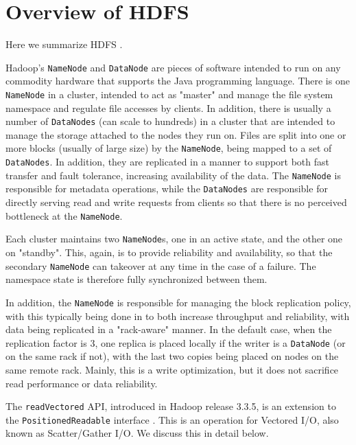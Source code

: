 \documentclass[letterpaper,twocolumn]{article}
\begin{document}
\vspace{-1em}
\section{Overview of HDFS}

Here we summarize HDFS \cite{1}.

Hadoop's \texttt{NameNode} and \texttt{DataNode} are pieces of software intended to run on any commodity hardware that supports the Java programming language. There is one \texttt{NameNode} in a cluster, intended to act as "master" and manage the file system namespace and regulate file accesses by clients. In addition, there is usually a number of \texttt{DataNodes} (can scale to hundreds) in a cluster that are intended to manage the storage attached to the nodes they run on. Files are split into one or more blocks (usually of large size) by the \texttt{NameNode}, being mapped to a set of \texttt{DataNodes}. In addition, they are replicated in a manner to support both fast transfer and fault tolerance, increasing availability of the data.  The \texttt{NameNode} is responsible for metadata operations, while the \texttt{DataNodes} are responsible for directly serving read and write requests from clients so that there is no perceived bottleneck at the \texttt{NameNode}.

\noindent Each cluster maintains two \texttt{NameNode}s, one in an active state, and the other one on "standby". This, again, is to provide reliability and availability, so that the secondary \texttt{NameNode} can takeover at any time in the case of a failure. The namespace state is therefore fully synchronized between them.

\noindent In addition, the \texttt{NameNode} is responsible for managing the block replication policy, with this typically being done in to both increase throughput and reliability, with data being replicated in a "rack-aware" manner. In the default case, when the replication factor is 3, one replica is placed locally if the writer is a \texttt{DataNode} (or on the same rack if not), with the last two copies being placed on nodes on the same remote rack. Mainly, this is a write optimization, but it does not sacrifice read performance or data reliability.

The \texttt{readVectored}  API, introduced in Hadoop release 3.3.5, is an extension to the \texttt{PositionedReadable} interface \cite{3}. This is an operation for Vectored I/O, also known as Scatter/Gather I/O. We discuss this in detail below.
\end{document}
